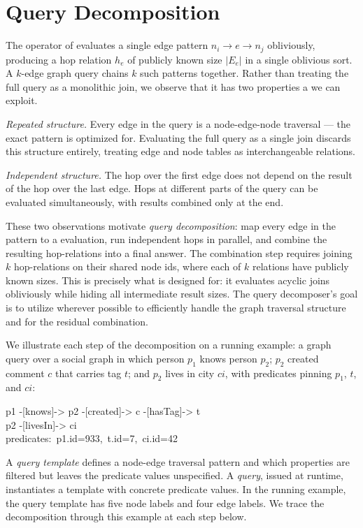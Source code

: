 \section{Query Decomposition}
\label{sec:decomposition}

The \onehop operator of  evaluates a single edge pattern
$n_i \rightarrow e \rightarrow n_j$ obliviously, producing a hop relation
$h_e$
of publicly known size $|E_e|$ in a single oblivious sort. A $k$-edge
graph query chains $k$ such patterns together. Rather than treating the
full query as a monolithic join, we observe that it has two properties a
we can exploit.

\emph{Repeated structure.} Every edge in the query is a node-edge-node
traversal --- the exact pattern \onehop is optimized for. Evaluating the full
query as a single join discards this structure entirely, treating edge and
node tables as interchangeable relations.

\emph{Independent structure.} The hop over the first edge does not depend
on the result of the hop over the last edge. Hops at different parts of the
query can be evaluated simultaneously, with results combined only at the
end.

These two observations motivate \emph{query decomposition}: map every edge
in the pattern to a \onehop evaluation, run independent hops in parallel,
and combine the resulting hop-relations into a final answer. The
combination step requires joining $k$ hop-relations on their shared node
ids, where each of $k$ relations have publicly known
sizes. This is precisely what \wei is designed for: it evaluates acyclic
joins obliviously while hiding all intermediate result sizes. The 
query decomposer's goal is to
utilize \onehop wherever possible to efficiently handle the graph traversal
structure and \wei for the residual combination.

We illustrate each step of the decomposition on a running example: a
graph query over a social graph in which person $p_1$ knows
person $p_2$; $p_2$ created comment $c$ that carries tag $t$; and $p_2$
lives in city $\mathit{ci}$, with predicates pinning $p_1$, $t$, and
$\mathit{ci}$:
\begin{center}
\small\ttfamily
p1 -[knows]-> p2 -[created]-> c -[hasTag]-> t \\
\phantom{p1 -[knows]-> }p2 -[livesIn]-> ci \\
\upshape predicates:\ttfamily\ p1.id=933,\ t.id=7,\ ci.id=42
\end{center}
A \emph{query template} defines a node-edge traversal 
pattern and which properties 
are filtered but leaves the predicate values unspecified. A \textit{query},
issued at runtime, instantiates a template with concrete 
predicate values. In the running example, the query template has five 
node labels and four edge labels. We trace the decomposition through 
this example at each step below.

